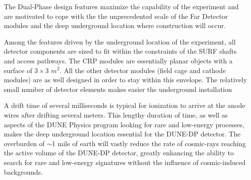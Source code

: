  The Dual-Phase design features maximize the capability of the experiment and are motivated to cope with the the unprecedented scale of the Far Detector modules and the deep underground location where construction will occur.

Among the features driven by the underground location of the experiment, all detector components are sized to fit within the constraints of the SURF shafts and access pathways. The CRP modules are essentially planar objects with a surface of $3 \times 3$ $m^2$. All the other detector modules (field cage and cathode modules) are as well designed in order to stay within this envelope. The relatively small number of detector elements makes easier the underground installation

A drift time of several milliseconds is typical for ionization to arrive at the anode wires after drifting several meters.  This lengthy duration of time, as well as aspects of the DUNE Physics program looking for rare and low-energy processes, makes the deep underground location essential for the DUNE-DP detector.  The overburden of $\sim$1 mile of earth will vastly reduce the rate of cosmic-rays reaching the active volume of the DUNE-DP detector, greatly enhancing the ability to search for rare and low-energy signatures without the influence of cosmic-induced backgrounds.  





